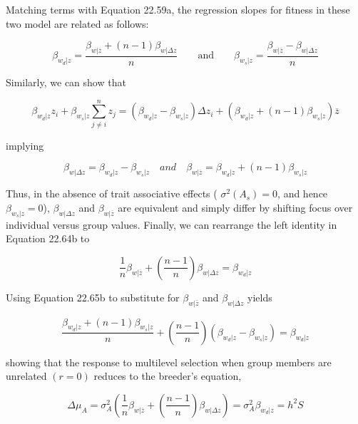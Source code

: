 \documentclass{article}
\begin{document}
Matching terms with Equation 22.59a, the regression slopes for fitness in these two model are related as follows:

\begin{equation}
\beta_{w_{d}|z}=\frac{\beta_{w|\overline{z}}+(n-1)\beta_{w|\Delta z}}{n}\qquad\mathrm{a n d}\qquad\beta_{w_{s}|z}=\frac{\beta_{w|\overline{z}}-\beta_{w|\Delta z}}{n}
\tag{22.64b}
\label{eq:22_64b}
\end{equation}

Similarly, we can show that

\begin{equation}
\beta_{w_{d}|z}z_{i}+\beta_{w_{s}|z}\sum_{j\neq i}^{n}z_{j}=\left(\beta_{w_{d}|z}-\beta_{w_{s}|z}\right)\Delta z_{i}+\left(\beta_{w_{d}|z}+(n-1)\beta_{w_{s}|z}\right)\overline{z}
\tag{22.65a}
\label{eq:22_65a}
\end{equation}

implying

\begin{equation}
\beta_{w|\Delta z}=\beta_{w_{d}|z}-\beta_{w_{s}|z}\quad and\quad\beta_{w|\overline{z}}=\beta_{w_{d}|z}+(n-1)\beta_{w_{s}|z}
\tag{22.65b}
\label{eq:22_65b}
\end{equation}

Thus, in the absence of trait associative effects ( $ \sigma^2(A_s) = 0 $, and hence  $ \beta_{w_s|z} = 0 $),  $ \beta_{w|\Delta z} $ and  $ \beta_{w|\overline{z}} $ are equivalent and simply differ by shifting focus over individual versus group values. Finally, we can rearrange the left identity in Equation 22.64b to

\begin{equation}
\frac{1}{n}\beta_{w|\overline{z}}+\left(\frac{n-1}{n}\right)\beta_{w|\Delta z}=\beta_{w_{d}|z}
\end{equation}

Using Equation 22.65b to substitute for  $ \beta_{w|\overline{z}} $ and  $ \beta_{w|\Delta z} $ yields

\begin{equation}
\frac{\beta_{w_{d}|z}+(n-1)\beta_{w_{s}|z}}{n}+\left(\frac{n-1}{n}\right)\left(\beta_{w_{d}|z}-\beta_{w_{s}|z}\right)=\beta_{w_{d}|z}
\end{equation}

showing that the response to multilevel selection when group members are unrelated  $ (r = 0) $ reduces to the breeder's equation,

\begin{equation}
\Delta\mu_{A}=\sigma_{A}^{2}\left(\frac{1}{n}\beta_{w|\overline{z}}+\left(\frac{n-1}{n}\right)\beta_{w|\Delta z}\right)=\sigma_{A}^{2}\beta_{w_{d}|z}=h^{2}S
\end{equation}
\end{document}

